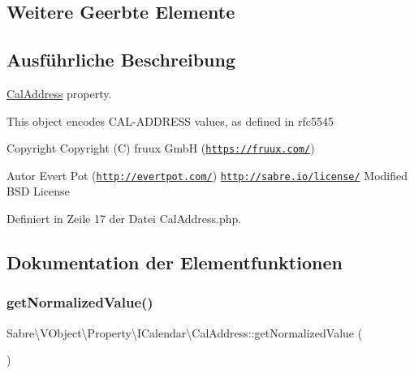 \subsection*{Weitere Geerbte Elemente}


\subsection{Ausführliche Beschreibung}
\mbox{\hyperlink{class_sabre_1_1_v_object_1_1_property_1_1_i_calendar_1_1_cal_address}{Cal\+Address}} property.

This object encodes C\+A\+L-\/\+A\+D\+D\+R\+E\+SS values, as defined in rfc5545

\begin{DoxyCopyright}{Copyright}
Copyright (C) fruux GmbH (\href{https://fruux.com/}{\tt https\+://fruux.\+com/}) 
\end{DoxyCopyright}
\begin{DoxyAuthor}{Autor}
Evert Pot (\href{http://evertpot.com/}{\tt http\+://evertpot.\+com/})  \href{http://sabre.io/license/}{\tt http\+://sabre.\+io/license/} Modified B\+SD License 
\end{DoxyAuthor}


Definiert in Zeile 17 der Datei Cal\+Address.\+php.



\subsection{Dokumentation der Elementfunktionen}
\mbox{\label{class_sabre_1_1_v_object_1_1_property_1_1_i_calendar_1_1_cal_address_a298550cee9679695690cd6fba859b79f}} 
\subsubsection{\texorpdfstring{get\+Normalized\+Value()}{getNormalizedValue()}}
{\footnotesize\ttfamily Sabre\textbackslash{}\+V\+Object\textbackslash{}\+Property\textbackslash{}\+I\+Calendar\textbackslash{}\+Cal\+Address\+::get\+Normalized\+Value (\begin{DoxyParamCaption}{ }\end{DoxyParamCaption})}

